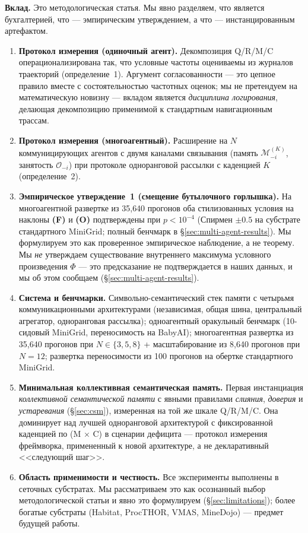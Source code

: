 \documentclass{article}
\begin{document}
\textbf{Вклад.} Это методологическая статья. Мы явно разделяем, что является бухгалтерией, что --- эмпирическим утверждением, а что --- инстанцированным артефактом.
\begin{enumerate}[leftmargin=20pt,itemsep=2pt,topsep=2pt]
\item \textbf{Протокол измерения (одиночный агент).} Декомпозиция Q/R/M/C операционализирована так, что условные частоты оцениваемы из журналов траекторий (определение~1). Аргумент согласованности --- это цепное правило вместе с состоятельностью частотных оценок; мы не претендуем на математическую новизну --- вкладом является \emph{дисциплина логирования}, делающая декомпозицию применимой к стандартным навигационным трассам.

\item \textbf{Протокол измерения (многоагентный).} Расширение на $N$ коммуницирующих агентов с двумя каналами связывания (память $\mathcal{M}_{-i}^{(K)}$, занятость $\mathcal{O}_{-i}$) при протоколе одноранговой рассылки с каденцией $K$ (определение~2).

\item \textbf{Эмпирическое утверждение~1 (смещение бутылочного горлышка).} На многоагентной развертке из 35{,}640 прогонов оба стилизованных условия на наклоны \textbf{(F)} и \textbf{(O)} подтверждены при $p<10^{-4}$ (Спирмен $\pm 0.5$ на субстрате стандартного MiniGrid; полный бенчмарк в \S\ref{sec:multi-agent-results}). Мы формулируем это как проверенное эмпирическое наблюдение, а не теорему. Мы \emph{не} утверждаем существование внутреннего максимума условного произведения $\Phi$ --- это предсказание не подтверждается в наших данных, и мы об этом сообщаем (\S\ref{sec:multi-agent-results}).

\item \textbf{Система и бенчмарки.} Символьно-семантический стек памяти с четырьмя коммуникационными архитектурами (независимая, общая шина, центральный агрегатор, одноранговая рассылка); одноагентный оракульный бенчмарк (10-сидовый MiniGrid, переносимость на BabyAI); многоагентная развертка из 35{,}640 прогонов при $N\!\in\!\{3,5,8\}$ + масштабирование из 8{,}640 прогонов при $N\!=\!12$; развертка переносимости из 100 прогонов на обертке стандартного MiniGrid.

\item \textbf{Минимальная коллективная семантическая память.} Первая инстанциация \emph{коллективной семантической памяти} с явными правилами \emph{слияния}, \emph{доверия} и \emph{устаревания} (\S\ref{sec:csm}), измеренная на той же шкале Q/R/M/C. Она доминирует над лучшей одноранговой архитектурой с фиксированной каденцией по (M$\,\times\,$C) в сценарии дефицита --- протокол измерения фреймворка, примененный к новой архитектуре, а не декларативный <<следующий шаг>>.

\item \textbf{Область применимости и честность.} Все эксперименты выполнены в сеточных субстратах. Мы рассматриваем это как осознанный выбор методологической статьи и явно это формулируем (\S\ref{sec:limitations}); более богатые субстраты (Habitat, ProcTHOR, VMAS, MineDojo) --- предмет будущей работы.
\end{enumerate}
\end{document}
